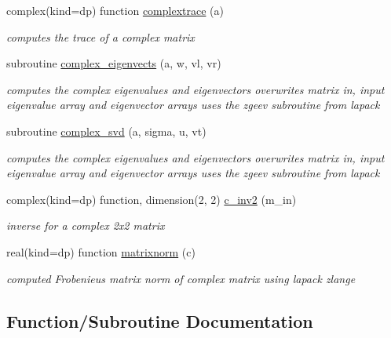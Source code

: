 \begin{DoxyCompactItemize}
complex(kind=dp) function \hyperlink{namespaceolis__f90stdlib_aaa6e9aabcf33a6f7052e1db5aa5dcf70}{complextrace} (a)
\begin{DoxyCompactList}\small\item\em computes the trace of a complex matrix \end{DoxyCompactList}\item 
subroutine \hyperlink{namespaceolis__f90stdlib_a71c5b363b52932a5c69053149ac8cc25}{complex\+\_\+eigenvects} (a, w, vl, vr)
\begin{DoxyCompactList}\small\item\em computes the complex eigenvalues and eigenvectors  overwrites matrix in, input eigenvalue array and eigenvector arrays uses the zgeev subroutine from lapack \end{DoxyCompactList}\item 
subroutine \hyperlink{namespaceolis__f90stdlib_a81e060e6ecfde9524a9732349a818db3}{complex\+\_\+svd} (a, sigma, u, vt)
\begin{DoxyCompactList}\small\item\em computes the complex eigenvalues and eigenvectors  overwrites matrix in, input eigenvalue array and eigenvector arrays uses the zgeev subroutine from lapack \end{DoxyCompactList}\item 
complex(kind=dp) function, dimension(2, 2) \hyperlink{namespaceolis__f90stdlib_a162dd5131a39a62d7b95e2ebca4664a4}{c\+\_\+inv2} (m\+\_\+in)
\begin{DoxyCompactList}\small\item\em inverse for a complex 2x2 matrix \end{DoxyCompactList}\item 
real(kind=dp) function \hyperlink{namespaceolis__f90stdlib_a43175b11cfecf961b5e6e597cfb2f848}{matrixnorm} (c)
\begin{DoxyCompactList}\small\item\em computed Frobenieus matrix norm of complex matrix using lapack zlange \end{DoxyCompactList}\end{DoxyCompactItemize}


\subsection{Function/\+Subroutine Documentation}
\mbox{\label{namespaceolis__f90stdlib_af0119bd404337367bc0727decf6dd89c}} 
